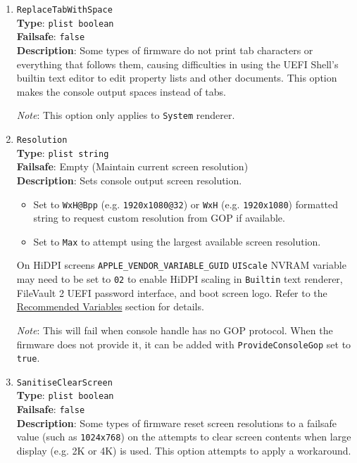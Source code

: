 \documentclass[]{article}
\providecommand{\tightlist}{%
  \setlength{\itemsep}{0pt}\setlength{\parskip}{0pt}}
\begin{document}
\begin{enumerate}
\item
  \texttt{ReplaceTabWithSpace}\\
  \textbf{Type}: \texttt{plist\ boolean}\\
  \textbf{Failsafe}: \texttt{false}\\
  \textbf{Description}: Some types of firmware do not print tab characters or everything
  that follows them, causing difficulties in using the UEFI Shell's builtin
  text editor to edit property lists and other documents. This option makes the console
  output spaces instead of tabs.

  \emph{Note}: This option only applies to \texttt{System} renderer.

\item
  \texttt{Resolution}\\
  \textbf{Type}: \texttt{plist\ string}\\
  \textbf{Failsafe}: Empty (Maintain current screen resolution)\\
  \textbf{Description}: Sets console output screen resolution.

  \begin{itemize}
  \tightlist
  \item Set to \texttt{WxH@Bpp} (e.g. \texttt{1920x1080@32}) or \texttt{WxH}
  (e.g. \texttt{1920x1080}) formatted string to request custom resolution
  from GOP if available.
  \item Set to \texttt{Max} to attempt using the largest
  available screen resolution.
  \end{itemize}

  On HiDPI screens \texttt{APPLE\_VENDOR\_VARIABLE\_GUID} \texttt{UIScale}
  NVRAM variable may need to be set to \texttt{02} to enable HiDPI scaling
  in \texttt{Builtin} text renderer, FileVault 2 UEFI password interface,
  and boot screen logo. Refer to the \hyperref[nvramvarsrec]{Recommended Variables}
  section for details.

  \emph{Note}: This will fail when console handle has no GOP protocol. When
  the firmware does not provide it, it can be added with \texttt{ProvideConsoleGop}
  set to \texttt{true}.

\item
  \texttt{SanitiseClearScreen}\\
  \textbf{Type}: \texttt{plist\ boolean}\\
  \textbf{Failsafe}: \texttt{false}\\
  \textbf{Description}: Some types of firmware reset screen resolutions to a failsafe
  value (such as \texttt{1024x768}) on the attempts to clear screen contents
  when large display (e.g. 2K or 4K) is used. This option attempts to apply
  a workaround.


\end{enumerate}
\end{document}
